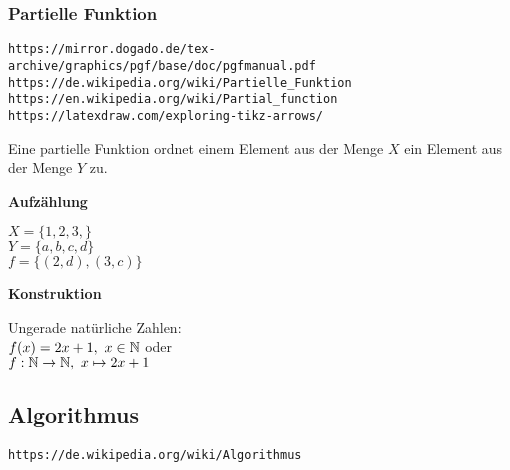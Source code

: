 \documentclass[10pt,a4paper]{article}
\begin{document}
\subsubsection {Partielle Funktion}

\verb+https://mirror.dogado.de/tex-archive/graphics/pgf/base/doc/pgfmanual.pdf+ \\
\verb+https://de.wikipedia.org/wiki/Partielle_Funktion+ \\
\verb+https://en.wikipedia.org/wiki/Partial_function+ \\
\verb+https://latexdraw.com/exploring-tikz-arrows/+
\vskip 8pt

Eine partielle Funktion ordnet einem Element aus der Menge $X$ ein
Element aus der Menge $Y$ zu.

\vskip 8pt
{\bf Aufzählung}

\vskip 8pt
$X = \{ 1, 2, 3, \}$ \\
$Y = \{ a, b, c, d \}$ \\
$f = \{ (2,d), (3,c)\}$

\vskip 8pt

\vskip 8pt
{\bf Konstruktion}

\vskip 8pt
Ungerade natürliche Zahlen: \\
$f(x) = 2x + 1,\ x \in \mathbb{N}$ oder \\
$f: \mathbb{N} \rightarrow \mathbb{N},\ x \mapsto 2x + 1$


\subsection {Algorithmus}

\verb+https://de.wikipedia.org/wiki/Algorithmus+
\vskip 8pt
\end{document}
